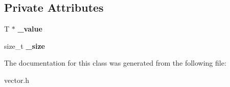 \subsection*{Private Attributes}
\begin{DoxyCompactItemize}
\item 
\mbox{\label{classyanujz_1_1vector_a1483399bbd46921c629ec261bb8121b2}} 
T $\ast$ {\bfseries \+\_\+value}
\item 
\mbox{\label{classyanujz_1_1vector_afffae7fe8ce95b099280e12652daf43c}} 
size\+\_\+t {\bfseries \+\_\+size}
\end{DoxyCompactItemize}


The documentation for this class was generated from the following file\+:\begin{DoxyCompactItemize}
\item 
vector.\+h\end{DoxyCompactItemize}
